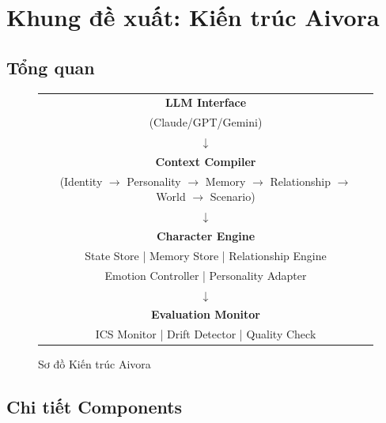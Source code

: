 \section{Khung đề xuất: Kiến trúc Aivora}

\subsection{Tổng quan}

\begin{figure}[H]
\centering
\caption{Sơ đồ Kiến trúc Aivora}
\label{fig:architecture}
\begin{tabular}{c}
\toprule
\multicolumn{1}{c}{\textbf{LLM Interface}} \\
\multicolumn{1}{c}{(Claude/GPT/Gemini)} \\
\midrule
$\downarrow$ \\
\multicolumn{1}{c}{\textbf{Context Compiler}} \\
\multicolumn{1}{c}{(Identity $\to$ Personality $\to$ Memory $\to$ Relationship $\to$ World $\to$ Scenario)} \\
\midrule
$\downarrow$ \\
\multicolumn{1}{c}{\textbf{Character Engine}} \\
\multicolumn{1}{c}{State Store | Memory Store | Relationship Engine} \\
\multicolumn{1}{c}{Emotion Controller | Personality Adapter} \\
\midrule
$\downarrow$ \\
\multicolumn{1}{c}{\textbf{Evaluation Monitor}} \\
\multicolumn{1}{c}{ICS Monitor | Drift Detector | Quality Check} \\
\bottomrule
\end{tabular}
\end{figure}

\subsection{Chi tiết Components}

